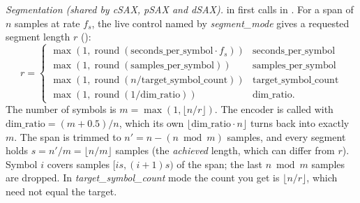 \emph{Segmentation (shared by cSAX, pSAX and dSAX).}  in
 first calls  in
. For a span of $n$ samples at rate $f_s$, the live control
named by \emph{segment\_mode} gives a requested segment length $r$
():
\[
r = \begin{cases}
\max(1, \operatorname{round}(\text{seconds\_per\_symbol}\cdot f_s)) & \text{seconds\_per\_symbol}\\
\max(1, \operatorname{round}(\text{samples\_per\_symbol})) & \text{samples\_per\_symbol}\\
\max(1, \operatorname{round}(n / \text{target\_symbol\_count})) & \text{target\_symbol\_count}\\
\max(1, \operatorname{round}(1/\text{dim\_ratio})) & \text{dim\_ratio.}
\end{cases}
\]
The number of symbols is $m = \max(1, \lfloor n/r \rfloor)$. The encoder is called with
$\text{dim\_ratio} = (m + 0.5)/n$, which its own $\lfloor \text{dim\_ratio}\cdot n\rfloor$
turns back into exactly $m$. The span is trimmed to $n' = n - (n \bmod m)$ samples, and every
segment holds $s = n'/m = \lfloor n/m \rfloor$ samples (the \emph{achieved} length, which can
differ from $r$). Symbol $i$ covers samples $[is, (i+1)s)$ of the span; the last
$n \bmod m$ samples are dropped. In \emph{target\_symbol\_count} mode the count you get is
$\lfloor n/r\rfloor$, which need not equal the target.

